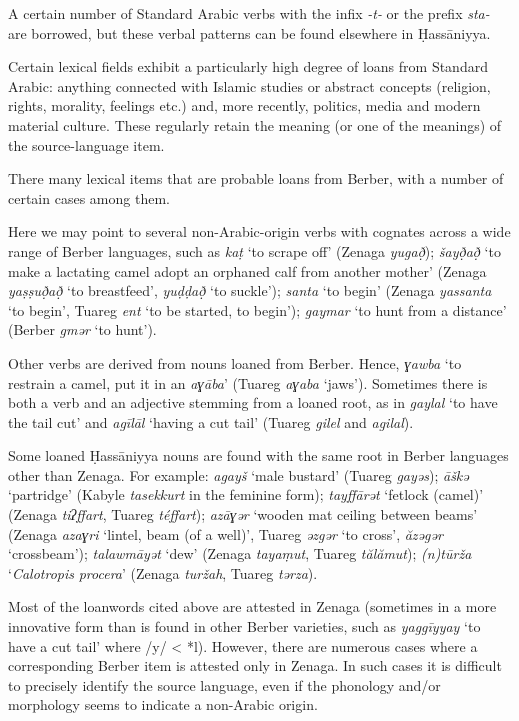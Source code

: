 \documentclass[output=paper]{langsci/langscibook}
\begin{document}
A certain number of Standard Arabic verbs with the infix \textit{{}-}\textit{t-} or the prefix \textit{sta-} are borrowed, but these verbal patterns can be found elsewhere in Ḥassāniyya. 

Certain lexical fields exhibit a particularly high degree of loans from Standard Arabic: anything connected with Islamic studies or abstract concepts (religion, rights, morality, feelings etc.) and, more recently, politics, media and modern material culture. These regularly retain the meaning (or one of the meanings) of the source-language item. 


There many lexical items that are probable loans from Berber, with a number of certain cases among them. 

Here we may point to several non-Arabic-origin verbs with cognates across a wide range of Berber languages, such as \textit{k{\R}aṭ} ‘to scrape off’ (Zenaga \textit{yug{\R}að̣}); \textit{šayð̣að̣} ‘to make a lactating camel adopt an orphaned calf from another mother’ (Zenaga \textit{yaṣṣuð̣að̣} ‘to breastfeed’, \textit{yuḍḍað̣} ‘to suckle’); \textit{santa} ‘to begin’ (Zenaga \textit{yassanta} ‘to begin’, Tuareg \textit{ent} ‘to be started, to begin’); \textit{gaymar} ‘to hunt from a distance’ (Berber \textit{gmər} ‘to hunt'). 

Other verbs are derived from nouns loaned from Berber. Hence, \textit{ɣawba} ‘to restrain a camel, put it in an \textit{aɣāba}’ (Tuareg \textit{aɣaba} ‘jaws’). Sometimes there is both a verb and an adjective stemming from a loaned root, as in \textit{gaylal} ‘to have the tail cut’ and \textit{agīlāl} ‘having a cut tail’ (Tuareg \textit{gilel} and \textit{agilal}). 

Some loaned Ḥassāniyya nouns are found with the same root in Berber languages other than Zenaga. For example: \textit{agayš} ‘male bustard’ (Tuareg \textit{gayəs}); \textit{āškə{\R}} ‘partridge’ (Kabyle \textit{tasekkurt} in the feminine form); \textit{tayffārət} ‘fetlock (camel)’ (Zenaga \textit{tiʔffart}, Tuareg \textit{téffart}); \textit{azāɣər} ‘wooden mat ceiling between beams’ (Zenaga \textit{azaɣri} ‘lintel, beam (of a well)’, Tuareg \textit{ǝzgər} ‘to cross’, \textit{ăzəgər} ‘crossbeam’); \textit{talawmāyət} ‘dew’ (Zenaga \textit{tayaṃut}, Tuareg \textit{tălămut}); \textit{(n)tūrža} ‘\textit{Calotropis} \textit{procera}’ (Zenaga \textit{turžah}, Tuareg \textit{tərza}).

Most of the loanwords cited above are attested in Zenaga (sometimes in a more innovative form than is found in other Berber varieties, such as \textit{yaggīyyay} ‘to have a cut tail’ where /y/ < *l). However, there are numerous cases where a corresponding Berber item is attested only in Zenaga. In such cases it is difficult to precisely identify the source language, even if the phonology and/or morphology seems to indicate a non-Arabic origin. 
\end{document}
